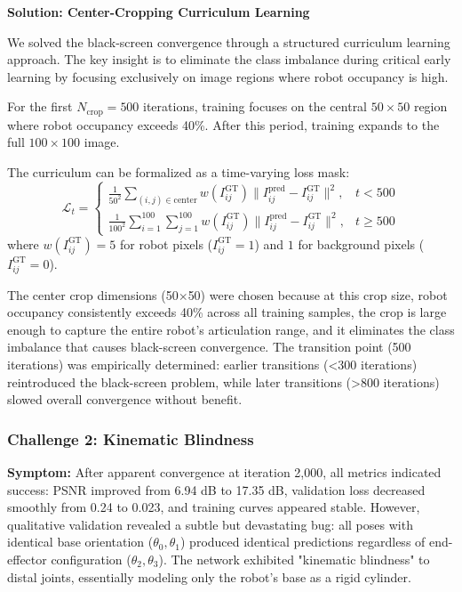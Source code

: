 \documentclass[12pt,a4paper,oneside]{report}
\begin{document}
\textbf{Solution: Center-Cropping Curriculum Learning}

We solved the black-screen convergence through a structured curriculum learning approach. The key insight is to eliminate the class imbalance during critical early learning by focusing exclusively on image regions where robot occupancy is high.

For the first $N_{\text{crop}} = 500$ iterations, training focuses on the central $50 \times 50$ region where robot occupancy exceeds 40\%. After this period, training expands to the full $100 \times 100$ image.

The curriculum can be formalized as a time-varying loss mask:
\begin{equation}
\mathcal{L}_t = \begin{cases}
\frac{1}{50^2} \sum_{(i,j) \in \text{center}} w(I_{ij}^{\text{GT}}) \|I_{ij}^{\text{pred}} - I_{ij}^{\text{GT}}\|^2, & t < 500 \\
\frac{1}{100^2} \sum_{i=1}^{100}\sum_{j=1}^{100} w(I_{ij}^{\text{GT}}) \|I_{ij}^{\text{pred}} - I_{ij}^{\text{GT}}\|^2, & t \geq 500
\end{cases}
\end{equation}
where $w(I_{ij}^{\text{GT}}) = 5$ for robot pixels ($I_{ij}^{\text{GT}} = 1$) and $1$ for background pixels ($I_{ij}^{\text{GT}} = 0$).

The center crop dimensions (50$\times$50) were chosen because at this crop size, robot occupancy consistently exceeds 40\% across all training samples, the crop is large enough to capture the entire robot's articulation range, and it eliminates the class imbalance that causes black-screen convergence. The transition point (500 iterations) was empirically determined: earlier transitions (<300 iterations) reintroduced the black-screen problem, while later transitions (>800 iterations) slowed overall convergence without benefit.

\subsubsection{Challenge 2: Kinematic Blindness}

\textbf{Symptom:} After apparent convergence at iteration 2,000, all metrics indicated success: PSNR improved from 6.94 dB to 17.35 dB, validation loss decreased smoothly from 0.24 to 0.023, and training curves appeared stable. However, qualitative validation revealed a subtle but devastating bug: all poses with identical base orientation ($\theta_0, \theta_1$) produced identical predictions regardless of end-effector configuration ($\theta_2, \theta_3$). The network exhibited "kinematic blindness" to distal joints, essentially modeling only the robot's base as a rigid cylinder.
\end{document}
